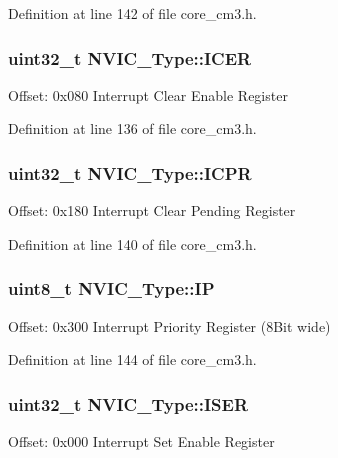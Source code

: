 Definition at line 142 of file core\+\_\+cm3.\+h.

\subsubsection[{\texorpdfstring{I\+C\+ER}{ICER}}]{ {\bf uint32\+\_\+t} N\+V\+I\+C\+\_\+\+Type\+::\+I\+C\+ER}\hypertarget{struct_n_v_i_c___type_a2cfb5b93103f658e0521d45bde6f84fd}{}\label{struct_n_v_i_c___type_a2cfb5b93103f658e0521d45bde6f84fd}
Offset\+: 0x080 Interrupt Clear Enable Register 

Definition at line 136 of file core\+\_\+cm3.\+h.

\subsubsection[{\texorpdfstring{I\+C\+PR}{ICPR}}]{ {\bf uint32\+\_\+t} N\+V\+I\+C\+\_\+\+Type\+::\+I\+C\+PR}\hypertarget{struct_n_v_i_c___type_a850acda355b0d6a404feb2be9df69b2d}{}\label{struct_n_v_i_c___type_a850acda355b0d6a404feb2be9df69b2d}
Offset\+: 0x180 Interrupt Clear Pending Register 

Definition at line 140 of file core\+\_\+cm3.\+h.

\subsubsection[{\texorpdfstring{IP}{IP}}]{ {\bf uint8\+\_\+t} N\+V\+I\+C\+\_\+\+Type\+::\+IP}\hypertarget{struct_n_v_i_c___type_a3ca7b7ff6aa6094772e524887739bf37}{}\label{struct_n_v_i_c___type_a3ca7b7ff6aa6094772e524887739bf37}
Offset\+: 0x300 Interrupt Priority Register (8\+Bit wide) 

Definition at line 144 of file core\+\_\+cm3.\+h.

\subsubsection[{\texorpdfstring{I\+S\+ER}{ISER}}]{ {\bf uint32\+\_\+t} N\+V\+I\+C\+\_\+\+Type\+::\+I\+S\+ER}\hypertarget{struct_n_v_i_c___type_a49017ceff4cda919c8058e9b192bfa08}{}\label{struct_n_v_i_c___type_a49017ceff4cda919c8058e9b192bfa08}
Offset\+: 0x000 Interrupt Set Enable Register 

